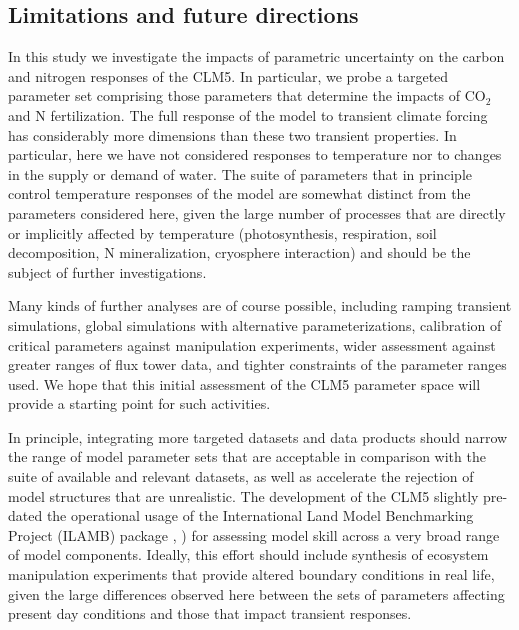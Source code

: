 \documentclass[draft,linenumbers]{agujournal}
\begin{document}
\subsection{Limitations and future directions}
In this study we investigate the impacts of parametric uncertainty on the carbon and nitrogen responses of the CLM5. In particular, we probe a targeted parameter set comprising those parameters that determine the impacts of CO$_{2}$ and N fertilization. The full response of the model to transient climate forcing has considerably more dimensions than these two transient properties. In particular, here we have not considered responses to temperature nor to changes in the supply or demand of water. The suite of parameters that in principle control temperature responses of the model are somewhat distinct from the parameters considered here, given the large number of processes that are directly or implicitly affected by temperature (photosynthesis, respiration, soil decomposition, N mineralization, cryosphere interaction) and should be the subject of further investigations. 

Many kinds of further analyses are of course possible, including ramping transient simulations,  global simulations with alternative parameterizations, calibration of critical parameters against manipulation experiments, wider assessment against greater ranges of flux tower data, and tighter constraints of the parameter ranges used. We hope that this initial assessment of the CLM5 parameter space will provide a starting point for such activities. 

In principle, integrating more targeted datasets and data products should narrow the range of model parameter sets that are acceptable in comparison with the suite of available and relevant datasets, as well as accelerate the rejection of model structures that are unrealistic.  The development of the CLM5 slightly pre-dated the operational usage of the International Land Model Benchmarking Project (ILAMB) package \cite{collier2018}, \cite{lawrence2018}) for assessing model skill across a very broad range of model components.  Ideally, this effort should include synthesis of ecosystem manipulation experiments that provide altered boundary conditions in real life, given the large differences observed here between the sets of parameters affecting present day conditions and those that impact transient responses.
\end{document}
